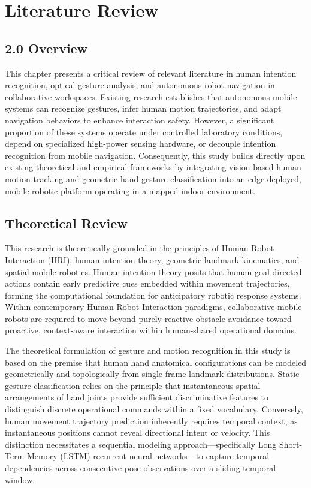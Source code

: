 \chapter{Literature Review}

\section*{2.0 Overview}
This chapter presents a critical review of relevant literature in human intention recognition, optical gesture analysis, and autonomous robot navigation in collaborative workspaces. Existing research establishes that autonomous mobile systems can recognize gestures, infer human motion trajectories, and adapt navigation behaviors to enhance interaction safety. However, a significant proportion of these systems operate under controlled laboratory conditions, depend on specialized high-power sensing hardware, or decouple intention recognition from mobile navigation. Consequently, this study builds directly upon existing theoretical and empirical frameworks by integrating vision-based human motion tracking and geometric hand gesture classification into an edge-deployed, mobile robotic platform operating in a mapped indoor environment.

\section{Theoretical Review}
This research is theoretically grounded in the principles of Human-Robot Interaction (HRI), human intention theory, geometric landmark kinematics, and spatial mobile robotics. Human intention theory posits that human goal-directed actions contain early predictive cues embedded within movement trajectories, forming the computational foundation for anticipatory robotic response systems. Within contemporary Human-Robot Interaction paradigms, collaborative mobile robots are required to move beyond purely reactive obstacle avoidance toward proactive, context-aware interaction within human-shared operational domains.

The theoretical formulation of gesture and motion recognition in this study is based on the premise that human hand anatomical configurations can be modeled geometrically and topologically from single-frame landmark distributions. Static gesture classification relies on the principle that instantaneous spatial arrangements of hand joints provide sufficient discriminative features to distinguish discrete operational commands within a fixed vocabulary. Conversely, human movement trajectory prediction inherently requires temporal context, as instantaneous positions cannot reveal directional intent or velocity. This distinction necessitates a sequential modeling approach—specifically Long Short-Term Memory (LSTM) recurrent neural networks—to capture temporal dependencies across consecutive pose observations over a sliding temporal window.

